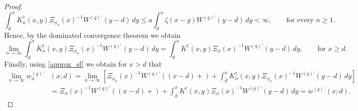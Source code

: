\documentclass[12pt,reqno]{amsart}
\newcommand{\green}{\textcolor[rgb]{0.00,0.70,.30}}
\theoremstyle{definition}
\theoremstyle{remark}
\begin{document}
\begin{proof}
\begin{equation*}
\int_d^x K_{n}^{\dagger}(x,y)\Xi_{\phi_n}(x)^{-1} W^{(q)\prime}(y-d)\,dy\le a 
\int_d^x \zeta(x-y) W^{(q)\prime}(y-d)\,dy<\infty,\qquad\text{for every $n\geq 1$}.
\end{equation*}
Hence, by the dominated convergence theorem we obtain 
\begin{equation*}
\lim_{n\to\infty}\int_d^xK_{n}^{\dagger}(x,y)\Xi_{\phi_n}(x)^{-1} W^{(q)\prime}(y-d)\,dy=
        \int_d^xK^{\dagger}(x,y)\Xi_{\phi}(x)^{-1} W^{(q)\prime}(y-d)\,dy,\qquad\text{for $x\geq d$}.
\end{equation*}
Finally, using \eqref{approx_sf} we obtain for $x>d$ that 
\begin{align*}
\lim_{n\to\infty}w_n^{(q)\prime}&(x;d)=\lim_{n\to\infty}\left[\Xi_{\phi_n}(x)^{-1} W^{(q)\prime}((x-d)+)+\int_d^x{K^{\dagger}_n}(x,y)
\Xi_{\phi_n}(x)^{-1} {W^{(q)\prime}}(y-d)\,dy\right]\\
&=\Xi_{\phi}(x)^{-1} W^{(q)\prime}((x-d)+)+\int_d^x{K^{\dagger}} (x,y) \Xi_{\phi}(x)^{-1} W^{(q)\prime}(y-d)\,dy=w^{(q)\prime}(x;d).
\end{align*}
\end{proof}
\end{document}
